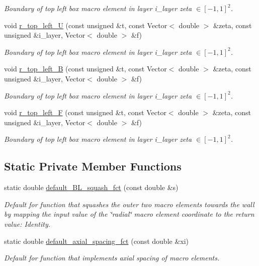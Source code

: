\begin{DoxyCompactItemize}
\begin{DoxyCompactList}\small\item\em Boundary of top left box macro element in layer i\+\_\+layer zeta $ \in [-1,1]^2 $. \end{DoxyCompactList}\item 
void \hyperlink{classoomph_1_1QuarterTubeDomain_ac1cda2361ed175bdf52032dce05f4365}{r\+\_\+top\+\_\+left\+\_\+U} (const unsigned \&t, const Vector$<$ double $>$ \&zeta, const unsigned \&i\+\_\+layer, Vector$<$ double $>$ \&f)
\begin{DoxyCompactList}\small\item\em Boundary of top left box macro element in layer i\+\_\+layer zeta $ \in [-1,1]^2 $. \end{DoxyCompactList}\item 
void \hyperlink{classoomph_1_1QuarterTubeDomain_ab7a0b29926aff44bb26d5544c8dadfb0}{r\+\_\+top\+\_\+left\+\_\+B} (const unsigned \&t, const Vector$<$ double $>$ \&zeta, const unsigned \&i\+\_\+layer, Vector$<$ double $>$ \&f)
\begin{DoxyCompactList}\small\item\em Boundary of top left box macro element in layer i\+\_\+layer zeta $ \in [-1,1]^2 $. \end{DoxyCompactList}\item 
void \hyperlink{classoomph_1_1QuarterTubeDomain_aee4f92da89db4fd8a7ff6e25995e1ca5}{r\+\_\+top\+\_\+left\+\_\+F} (const unsigned \&t, const Vector$<$ double $>$ \&zeta, const unsigned \&i\+\_\+layer, Vector$<$ double $>$ \&f)
\begin{DoxyCompactList}\small\item\em Boundary of top left box macro element in layer i\+\_\+layer zeta $ \in [-1,1]^2 $. \end{DoxyCompactList}\end{DoxyCompactItemize}
\subsection*{Static Private Member Functions}
\begin{DoxyCompactItemize}
\item 
static double \hyperlink{classoomph_1_1QuarterTubeDomain_a3dc9c2857eb6bd7e3ee89d2a7c86bd3b}{default\+\_\+\+B\+L\+\_\+squash\+\_\+fct} (const double \&s)
\begin{DoxyCompactList}\small\item\em Default for function that squashes the outer two macro elements towards the wall by mapping the input value of the \char`\"{}radial\char`\"{} macro element coordinate to the return value\+: Identity. \end{DoxyCompactList}\item 
static double \hyperlink{classoomph_1_1QuarterTubeDomain_ae568259fc1321c4bcbfae24e42e3b0f6}{default\+\_\+axial\+\_\+spacing\+\_\+fct} (const double \&xi)
\begin{DoxyCompactList}\small\item\em Default for function that implements axial spacing of macro elements. \end{DoxyCompactList}\end{DoxyCompactItemize}
